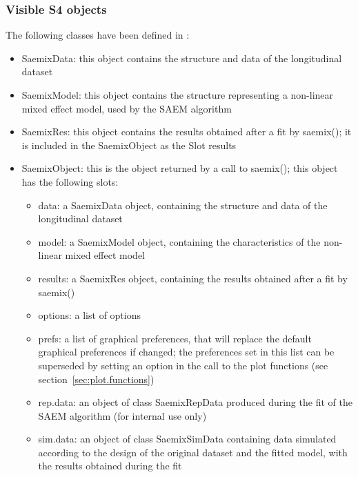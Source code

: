 \subsubsection{Visible S4 objects}

The following classes have been defined in \saemix:
\begin{itemize}
\item {\sf SaemixData}: this object contains the structure and data of the longitudinal dataset
\item {\sf SaemixModel}: this object contains the structure representing a non-linear mixed effect model, used by the {\sf SAEM} algorithm
\item {\sf SaemixRes}: this object contains the results obtained after a fit by {\sf saemix()}; it is included in the {\sf SaemixObject} as the Slot {\sf results}
\item {\sf SaemixObject}: this is the object returned by a call to {\sf saemix()}; this object has the following slots:
   \begin{itemize}
   \item data: a {\sf SaemixData} object, containing the structure and data of the longitudinal dataset
   \item model: a {\sf SaemixModel} object, containing the characteristics of the non-linear mixed effect model
   \item results: a {\sf SaemixRes} object, containing the results obtained after a fit by {\sf saemix()}
   \item options: a list of options
   \item prefs: a list of graphical preferences, that will replace the default graphical preferences if changed; the preferences set in this list can be superseded by setting an option in the call to the plot functions (see section~\ref{sec:plot.functions})
   \item rep.data: an object of class {\sf SaemixRepData} produced during the fit of the {\sf SAEM} algorithm (for internal use only)
   \item sim.data: an object of class {\sf SaemixSimData} containing data simulated according to the design of the original dataset and the fitted model, with the results obtained during the fit
   \end{itemize}
\end{itemize}

